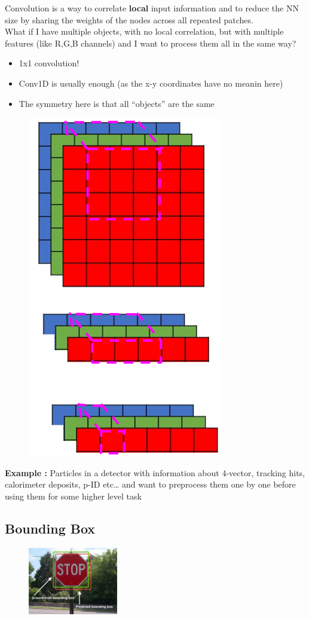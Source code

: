 Convolution is a way to correlate \textbf{local} input information and to reduce the NN size by sharing the weights of the nodes across all repeated patches.\\

What if I have multiple objects, with no local correlation, but with multiple features (like R,G,B channels) and I want to process them all in the same way?
\begin{itemize}
	\item 1x1 convolution!
	\item Conv1D is usually enough (as the x-y coordinates have no meanin here)
	\item The symmetry here is that all “objects” are the same
\end{itemize}

\begin{figure}[ht]
	\centering
	\includegraphics[width=0.3\linewidth]{figure_ml/more_conv.png}
\end{figure}
\FloatBarrier

\textbf{Example :} Particles in a detector with information about 4-vector, tracking hits, calorimeter deposits, p-ID etc… and want to preprocess them one by one before using them for some higher level task


\subsection{Bounding Box}

 \begin{figure}
	\includegraphics[width=0.35\textwidth]{figure_ml/stop_bb.png}
\end{figure}

